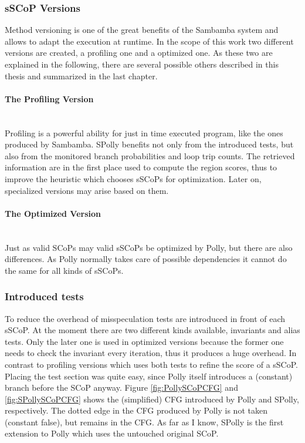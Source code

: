 \subsubsection{sSCoP Versions}
Method versioning is one of the great benefits of the Sambamba system and allows
to adapt the execution at runtime. In the scope of this work two different 
versions are created, a profiling one and a optimized one. As these two are 
explained in the following, there are several possible others described in this
thesis and summarized in the last chapter. 



\paragraph{The Profiling Version\\}
~\\
Profiling is a powerful ability for just in time executed program, like the ones
produced by Sambamba. SPolly benefits not only from the introduced tests, but also
from the monitored branch probabilities and loop trip counts. The retrieved 
information are in the first place used to compute the region scores, thus to
improve the heuristic which chooses sSCoPs for optimization. Later on,
specialized versions may arise based on them. 



\paragraph{The Optimized Version \\}
~\\
Just as valid SCoPs may valid sSCoPs be optimized by Polly, but there are also 
differences. As Polly normally takes care of possible dependencies it cannot 
do the same for all kinds of sSCoPs. 



\subsubsection{Introduced tests}
To reduce the overhead of misspeculation tests are introduced in front of
each sSCoP. At the moment there are two different kinds available, 
invariants and alias tests. Only the later one is used in optimized 
versions because the former one needs to check the invariant
every iteration, thus it produces a huge overhead. In contrast to profiling 
versions which uses both tests to refine the score of a sSCoP.
Placing the test section was quite easy, since
Polly itself introduces a (constant) branch before the SCoP anyway. Figure
\ref{fig:PollySCoPCFG} and \ref{fig:SPollySCoPCFG} shows the (simplified) 
CFG introduced by Polly and SPolly, respectively. The dotted edge in the CFG
produced by Polly is not taken (constant false), but remains in the CFG. As far
as I know, SPolly is the first extension to Polly which uses the untouched 
original SCoP.


